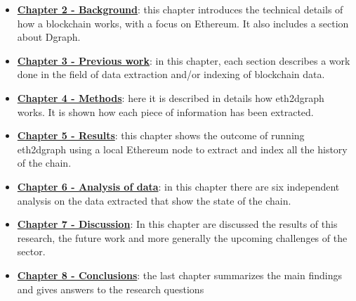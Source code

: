 \begin{itemize}
    \item \hyperref[chapter-2]{\textbf{Chapter 2 - Background}}: this chapter introduces the technical details of how a blockchain works, with a focus on Ethereum. It also includes a section about Dgraph. 
    \item \hyperref[chapter-3]{\textbf{Chapter 3 - Previous work}}: in this chapter, each section describes a work done in the field of data extraction and/or indexing of blockchain data.
    \item \hyperref[chapter-4]{\textbf{Chapter 4 - Methods}}: here it is described in details how eth2dgraph works. It is shown how each piece of information has been extracted.
    \item \hyperref[chapter-5]{\textbf{Chapter 5 - Results}}: this chapter shows the outcome of running eth2dgraph using a local Ethereum node to extract and index all the history of the chain.  
    \item \hyperref[chapter-analysis]{\textbf{Chapter 6 - Analysis of data}}: in this chapter there are six independent analysis on the data extracted that show the state of the chain.
    \item \hyperref[chapter-discussion]{\textbf{Chapter 7 - Discussion}}: In this chapter are discussed the results of this research, the future work and more generally the upcoming challenges of the sector.
    \item \hyperref[chapter-conclusions]{\textbf{Chapter 8 - Conclusions}}: the last chapter summarizes the main findings and gives answers to the research questions
\end{itemize}

